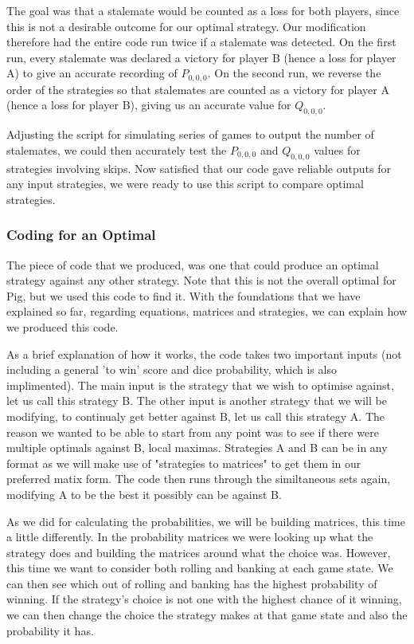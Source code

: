\documentclass[a4paper,titlepage]{article}
\begin{document}
The goal was that a stalemate would be counted as a loss for both players, since this is not a desirable outcome for our optimal strategy. Our modification therefore had the entire code run twice if a stalemate was detected. On the first run, every stalemate was declared a victory for player B (hence a loss for player A) to give an accurate recording of $P_{0,0,0}$. On the second run, we reverse the order of the strategies so that stalemates are counted as a victory for player A (hence a loss for player B), giving us an accurate value for $Q_{0,0,0}$.

Adjusting the script for simulating series of games to output the number of stalemates, we could then accurately test the $P_{0,0,0}$ and $Q_{0,0,0}$ values for strategies involving skips. Now satisfied that our code gave reliable outputs for any input strategies, we were ready to use this script to compare optimal strategies.

\subsubsection{Coding for an Optimal}

The piece of code that we produced, was one that could produce an optimal strategy against any other strategy. Note that this is not the overall optimal for Pig, but we used this code to find it. With the foundations that we have explained so far, regarding equations, matrices and strategies, we can explain how we produced this code.

As a brief explanation of how it works, the code takes two important inputs (not including a general 'to win' score and dice probability, which is also implimented). The main input is the strategy that we wish to optimise against, let us call this strategy B. The other input is another strategy that we will be modifying, to continualy get better against B, let us call this strategy A. The reason we wanted to be able to start from any point was to see if there were multiple optimals against B, local maximas. Strategies A and B can be in any format as we will make use of "strategies to matrices" to get them in our preferred matix form. The code then runs through the similtaneous sets again, modifying A to be the best it possibly can be against B.

As we did for calculating the probabilities, we will be building matrices, this time a little differently. In the probability matrices we were looking up what the strategy does and building the matrices around what the choice was. However, this time we want to consider both rolling and banking at each game state. We can then see which out of rolling and banking has the highest probability of winning. If the strategy's choice is not one with the highest chance of it winning, we can then change the choice the strategy makes at that game state and also the probability it has.
\end{document}

